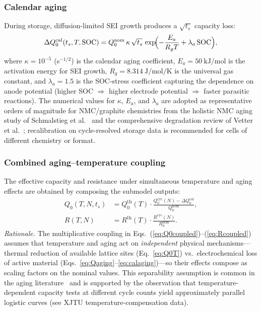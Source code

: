 \documentclass[5p,times,number]{elsarticle}
\newcommand{\eqnrefp}[1]{\hyperref[#1]{\textup{Eq.~\ref*{#1}}}}
\newcommand{\eqnsref}[2]{\hyperref[#1]{\textup{Eqs.~(\ref*{#1})}}--\hyperref[#2]{\textup{(\ref*{#2})}}}
\newcommand{\refsref}[2]{\hyperref[#1]{\textup{Eqs.~\ref*{#1}}}--\hyperref[#2]{\textup{\ref*{#2}}}}
\def\eqnrefp#1{Eq.~\ref{#1}}
\def\eqnsref#1#2{Eqs.~(\ref{#1})--(\ref{#2})}
\def\refsref#1#2{Eqs.~\ref{#1}--\ref{#2}}
\begin{document}
\subsubsection{Calendar aging}
During storage, diffusion-limited SEI growth produces a $\sqrt{t_s}$ capacity loss:
\begin{equation}\label{eq:calaging}
\Delta Q_0^{\mathrm{cal}}(t_s, T, \mathrm{SOC}) = Q_0^{\mathrm{nom}}\,\kappa\,\sqrt{t_s}\,\exp\!\Bigl(-\frac{E_a}{R_g T} + \lambda_a\,\mathrm{SOC}\Bigr),
\end{equation}
where $\kappa = 10^{-5}$ (s$^{-1/2}$) is the calendar aging coefficient, $E_a = \SI{50}{\kilo\joule\per\mole}$ is the activation energy for SEI growth, $R_g = \SI{8.314}{\joule\per\mole\per\kelvin}$ is the universal gas constant, and $\lambda_a = 1.5$ is the SOC-stress coefficient capturing the dependence on anode potential (higher SOC $\Rightarrow$ higher electrode potential $\Rightarrow$ faster parasitic reactions). The numerical values for $\kappa$, $E_a$, and $\lambda_a$ are adopted as representative orders of magnitude for NMC/graphite chemistries from the holistic NMC aging study of Schmalstieg et al.~\cite{Schmalstieg2014JPS} and the comprehensive degradation review of Vetter et al.~\cite{Vetter2005}; recalibration on cycle-resolved storage data is recommended for cells of different chemistry or format.

\subsubsection{Combined aging--temperature coupling}\label{sec:coupling}
The effective capacity and resistance under simultaneous temperature and aging effects are obtained by composing the submodel outputs:
\begin{align}
Q_0(T, N, t_s) &= Q_0^{\mathrm{th}}(T) \cdot \frac{Q_0^{\mathrm{cyc}}(N) - \Delta Q_0^{\mathrm{cal}}}{Q_0^{\mathrm{nom}}}, \label{eq:Q0coupled}\\[4pt]
R(T, N) &= R^{\mathrm{th}}(T) \cdot \frac{R^{\mathrm{cyc}}(N)}{R_0^{\mathrm{nom}}}. \label{eq:Rcoupled}
\end{align}
\emph{Rationale.}
The multiplicative coupling in \eqnsref{eq:Q0coupled}{eq:Rcoupled} assumes that temperature and aging act on \emph{independent} physical mechanisms---thermal reduction of available lattice sites (\eqnrefp{eq:Q0T}) vs.\ electrochemical loss of active material (\refsref{eq:Qaging}{eq:calaging})---so their effects compose as scaling factors on the nominal values.
This separability assumption is common in the aging literature~\cite{Vetter2005,Li2019,Tang2019ECM} and is supported by the observation that temperature-dependent capacity tests at different cycle counts yield approximately parallel logistic curves (see XJTU temperature-compensation data).
\end{document}
